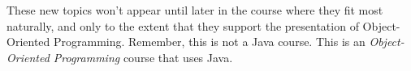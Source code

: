 \documentclass{article}
\begin{document}
These new topics won't appear until later in the course where they fit most naturally, and only to the extent that they support the presentation of Object-Oriented Programming.  Remember, this is not a Java course.  This is an {\it Object-Oriented Programming} course that uses Java.


%





%
%
\end{document}
